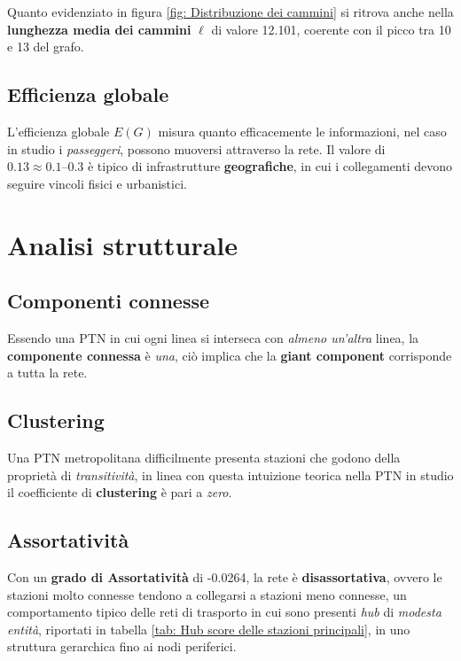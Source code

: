 Quanto evidenziato in figura \ref{fig: Distribuzione dei cammini} si ritrova anche nella \textbf{lunghezza media dei cammini} $\ell$ di valore 12.101, coerente con il picco tra 10 e 13 del grafo.

\subsection{Efficienza globale}
L'efficienza globale $E(G)$ misura quanto efficacemente le informazioni, nel caso in studio i \textit{passeggeri}, possono muoversi attraverso la rete. Il valore di $0.13 \approx 0.1\text{--}0.3$ è tipico di infrastrutture \textbf{geografiche}, in cui i collegamenti devono seguire vincoli fisici e urbanistici.

\section{Analisi strutturale}

\subsection{Componenti connesse}
Essendo una PTN in cui ogni linea si interseca con \textit{almeno un'altra} linea, la \textbf{componente connessa} è \textit{una}, ciò implica che la \textbf{giant component} corrisponde a tutta la rete.

\subsection{Clustering}
Una PTN metropolitana difficilmente presenta stazioni che godono della proprietà di \textit{transitività}, in linea con questa intuizione teorica nella PTN in studio il coefficiente di \textbf{clustering} è pari a \textit{zero}.

\subsection{Assortatività}
Con un \textbf{grado di Assortatività} di -0.0264, la rete è \textbf{disassortativa}, ovvero le stazioni molto connesse tendono a collegarsi a stazioni meno connesse, un comportamento tipico delle reti di trasporto in cui sono presenti \textit{hub} di \textit{modesta entità}, riportati in tabella \ref{tab: Hub score delle stazioni principali}, in uno struttura gerarchica fino ai nodi periferici.

